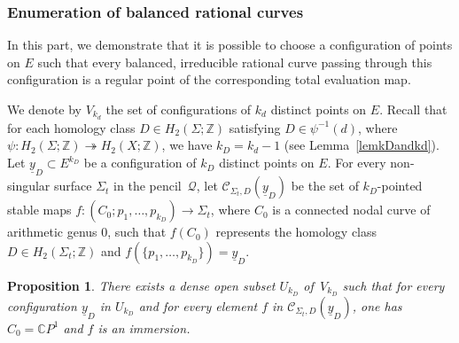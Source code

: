 \documentclass[11pt]{amsart}
\numberwithin{equation}{section}
\theoremstyle{definition}
\theoremstyle{plain}
\newtheorem{proposition}[definition]{Proposition}
\theoremstyle{remark}
\newcommand{\Z}{\mathbb{Z}}
\newcommand{\C}{\mathbb{C}}
\begin{document}
\subsubsection{Enumeration of balanced rational curves}

 In this part, we demonstrate that it is possible to choose a configuration of points on $E$ such that every balanced, irreducible rational curve passing through this configuration is a regular point of the corresponding total evaluation map.  
 
     We denote by $V_{k_d}$ the set of configurations of $k_d$ distinct points on $E$. Recall that for each homology class $D\in H_2(\Sigma;\Z)$ satisfying $D\in \psi^{-1}(d)$, where $\psi\colon H_2(\Sigma;\Z)	\twoheadrightarrow H_2(X;\Z)$, we have $k_D=k_d-1$ (see Lemma~\ref{lemkDandkd}).
     Let $\underline{y}_D\subset E^{k_D}$ be a configuration of $k_D$ distinct points on $E$.  For every non-singular surface $\Sigma_t$ in the pencil~$\mathcal{Q}$, let $\mathcal{C}_{\Sigma_t,D}(\underline{y}_D)$ be the set of $k_D$-pointed stable maps $f\colon (C_0;p_1,\ldots,p_{k_D})\to \Sigma_t$, where $C_0$ is a connected nodal curve of arithmetic genus $0$,
   such that $f(C_0)$ represents the homology class $D\in H_2(\Sigma_t;\Z)$  
    and $f(\{p_1,\ldots,p_{k_D}\})=\underline{y}_D$.
    
\begin{proposition} \label{Prop.Modulispace1}
There exists a dense open subset $U_{k_D}$ of\, $V_{k_D}$ such that for every configuration $\underline{y}_D$ in $U_{k_D}$ and for every element $f$ in $\mathcal{C}_{\Sigma_t,D}(\underline{y}_D)$, one has $C_0= \C P^1$ and $f$ is an immersion.
\end{proposition}
\end{document}
